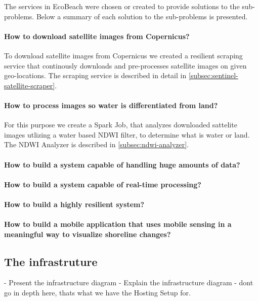 \noindent
The services in EcoBeach were chosen or created to provide solutions to the sub-problems. Below a summary of each solution to the sub-problems is presented.

\paragraph{How to download satellite images from Copernicus?} To download satellite images from Copernicus we created a resilient scraping service that continously downloads and pre-processes satellite images on given geo-locations. The scraping service is described in detail in \autoref{subsec:sentinel-satellite-scraper}.

\paragraph{How to process images so water is differentiated from land?} For this purpose we create a Spark Job, that analyzes downloaded sattelite images utlizing a water based NDWI  filter, to determine what is water or land. The NDWI Analyzer is described in \autoref{subsec:ndwi-analyzer}.

\paragraph{How to build a system capable of handling huge amounts of data?}
\paragraph{How to build a system capable of real-time processing?}
\paragraph{How to build a highly resilient system?}
\paragraph{How to build a mobile application that uses mobile sensing in a meaningful way to visualize shoreline changes?}

\subsection{The infrastruture}
- Present the infrastructure diagram
- Explain the infrastructure diagram
- dont go in depth here, thats what we have the Hosting Setup for.

